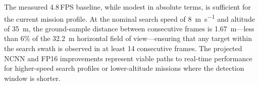 The measured 4.8\,FPS baseline, while modest in absolute terms, is sufficient for the current mission profile.  At the nominal search speed of \SI{8}{\metre\per\second} and altitude of \SI{35}{\metre}, the ground-sample distance between consecutive frames is \SI{1.67}{\metre}---less than 6\% of the \SI{32.2}{\metre} horizontal field of view---ensuring that any target within the search swath is observed in at least 14 consecutive frames.  The projected NCNN and FP16 improvements represent viable paths to real-time performance for higher-speed search profiles or lower-altitude missions where the detection window is shorter.
